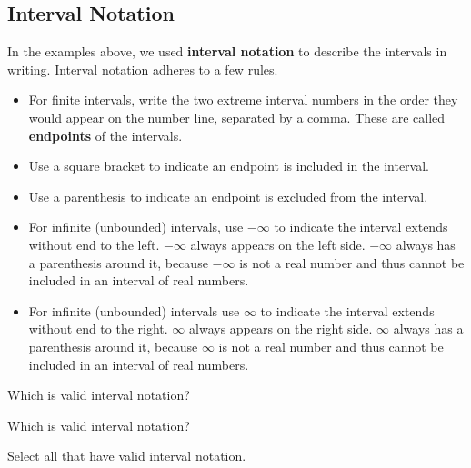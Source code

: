 \documentclass{ximera}
\begin{document}
\subsection*{Interval Notation}

In the examples above, we used \textbf{interval notation} to describe the intervals in writing. Interval notation adheres to a few rules.

\begin{itemize}
\item For finite intervals, write the two extreme interval numbers in the order they would appear on the number line, separated by a comma.  These are called \textbf{endpoints} of the intervals.
\item Use a square bracket to indicate an endpoint is included in the interval.
\item Use a parenthesis to indicate an endpoint is excluded from the interval.
\item For infinite (unbounded) intervals, use $-\infty$ to indicate the interval extends without end to the left. $-\infty$ always appears on the left side. $-\infty$ always has a parenthesis around it, because $-\infty$ is not a real number and thus cannot be included in an interval of real numbers.
\item For infinite (unbounded) intervals use $\infty$ to indicate the interval extends without end to the right. $\infty$ always appears on the right side. $\infty$ always has a parenthesis around it, because $\infty$ is not a real number and thus cannot be included in an interval of real numbers. 
\end{itemize}


\begin{question}
Which is valid interval notation?
	\begin{multipleChoice}
	\choice {$[3, -2)$}
	\choice [correct]{$[-2, 3)$}
	\end{multipleChoice}
\end{question}



\begin{question}
Which is valid interval notation?
	\begin{multipleChoice}
	\choice {$[1, \infty]$}
	\choice [correct]{$[1, \infty)$}
	\end{multipleChoice}
\end{question}



\begin{question}
Select all that have valid interval notation.
	\begin{selectAll}
	\choice {$[-3, -5]$}
	\choice [correct]{$[1, 8)$}
	\choice [correct]{$(-\infty, -4]$}
	\choice {$[-\infty, 7)$}
	\choice [correct]{$(-1, 2]$}
	\choice {$[6, 2]$}
	\end{selectAll}
\end{question}
\end{document}
